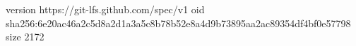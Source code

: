 version https://git-lfs.github.com/spec/v1
oid sha256:6e20ac46a2c5d8a2d1a3a5c8b78b52e8a4d9b73895aa2ac89354df4bf0e57798
size 2172
